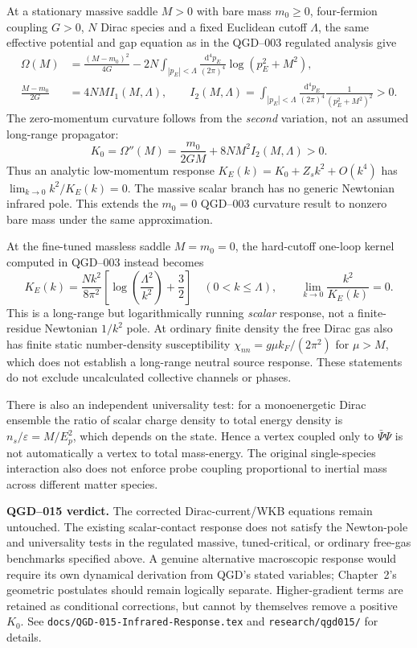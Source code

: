 \documentclass[11pt,a4paper]{article}
\newcommand{\dd}{\mathrm d}
\begin{document}
At a stationary massive saddle $M>0$ with bare mass $m_0\ge0$, four-fermion coupling $G>0$, $N$ Dirac species and a fixed Euclidean cutoff $\Lambda$, the same effective potential and gap equation as in the QGD--003 regulated analysis give
\begin{align}
\Omega(M)&=\frac{(M-m_0)^2}{4G}-2N\int_{|p_E|<\Lambda}\frac{\dd^4p_E}{(2\pi)^4}\log(p_E^2+M^2),\\
\frac{M-m_0}{2G}&=4NM I_1(M,\Lambda),\qquad I_2(M,\Lambda)=\int_{|p_E|<\Lambda}\frac{\dd^4p_E}{(2\pi)^4}\frac{1}{(p_E^2+M^2)^2}>0.
\end{align}
The zero-momentum curvature follows from the \emph{second} variation, not an assumed long-range propagator:
\begin{equation}\label{eq:qgd015-k0}
\boxed{K_0=\Omega''(M)=\frac{m_0}{2GM}+8NM^2I_2(M,\Lambda)>0.}
\end{equation}
Thus an analytic low-momentum response $K_E(k)=K_0+Z_s k^2+O(k^4)$ has $\lim_{k\to0}k^2/K_E(k)=0$. The massive scalar branch has no generic Newtonian infrared pole. This extends the $m_0=0$ QGD--003 curvature result to nonzero bare mass under the same approximation.

At the fine-tuned massless saddle $M=m_0=0$, the hard-cutoff one-loop kernel computed in QGD--003 instead becomes
\begin{equation}\label{eq:qgd015-critical}
K_E(k)=\frac{Nk^2}{8\pi^2}\left[\log\!\left(\frac{\Lambda^2}{k^2}\right)+\frac32\right]
\quad(0<k\le\Lambda),\qquad
\boxed{\lim_{k\to0}\frac{k^2}{K_E(k)}=0.}
\end{equation}
This is a long-range but logarithmically running \emph{scalar} response, not a finite-residue Newtonian $1/k^2$ pole. At ordinary finite density the free Dirac gas also has finite static number-density susceptibility $\chi_{nn}=g\mu k_F/(2\pi^2)$ for $\mu>M$, which does not establish a long-range neutral source response. These statements do not exclude uncalculated collective channels or phases.

There is also an independent universality test: for a monoenergetic Dirac ensemble the ratio of scalar charge density to total energy density is $n_s/\varepsilon=M/E_p^2$, which depends on the state. Hence a vertex coupled only to $\bar\Psi\Psi$ is not automatically a vertex to total mass-energy. The original single-species interaction also does not enforce probe coupling proportional to inertial mass across different matter species.

\noindent\textbf{QGD--015 verdict.} The corrected Dirac-current/WKB equations remain untouched. The existing scalar-contact response does not satisfy the Newton-pole and universality tests in the regulated massive, tuned-critical, or ordinary free-gas benchmarks specified above. A genuine alternative macroscopic response would require its own dynamical derivation from QGD's stated variables; Chapter~2's geometric postulates should remain logically separate. Higher-gradient terms are retained as conditional corrections, but cannot by themselves remove a positive $K_0$. See \texttt{docs/QGD-015-Infrared-Response.tex} and \texttt{research/qgd015/} for details.
\end{document}
